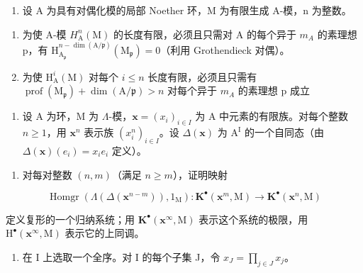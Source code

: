\begin{enumerate}
\def\labelenumi{\arabic{enumi})}
\setcounter{enumi}{5}
\tightlist
\item
  设 A 为具有对偶化模的局部 Noether 环，M 为有限生成 A-模，n 为整数。
\end{enumerate}

\begin{enumerate}
\def\labelenumi{\alph{enumi})}
\item
  为使 A-模 \(H_{\mathrm{A}}^{n}(\mathrm{M})\) 的长度有限，必须且只需对 A 的每个异于 \(m_{A}\) 的素理想 p，有 \(\mathrm{H}_{\mathrm{A}_{\mathfrak{p}}}^{n-\dim(\mathrm{A}/\mathfrak{p})}(\mathrm{M}_{\mathfrak{p}})=0\)（利用 Grothendieck 对偶）。
\item
  为使 \(\mathrm{H}_{\mathrm{A}}^{i}(\mathrm{M})\) 对每个 \(i \leqslant n\) 长度有限，必须且只需有 \(\operatorname{prof}(\mathrm{M}_{\mathfrak{p}}) + \dim(\mathrm{A}/\mathfrak{p}) > n\) 对每个异于 \(m_{A}\) 的素理想 p 成立
\end{enumerate}

\begin{enumerate}
\def\labelenumi{\arabic{enumi})}
\setcounter{enumi}{6}
\tightlist
\item
  设 A 为环，M 为 \(\Lambda\)-模，\(\mathbf{x} = (x_i)_{i \in I}\) 为 A 中元素的有限族。对每个整数 \(n \geqslant 1\)，用 \(\mathbf{x}^n\) 表示族 \((x_i^n)_{i \in I}\)。设 \(\Delta(\mathbf{x})\) 为 \(\mathrm{A}^{\mathrm{I}}\) 的一个自同态（由 \(\Delta(\mathbf{x})(e_i) = x_i e_i\) 定义）。
\end{enumerate}

\begin{enumerate}
\def\labelenumi{\alph{enumi})}
\tightlist
\item
  对每对整数 \((n, m)\)（满足 \(n \geqslant m\)），证明映射
\end{enumerate}

\[
\operatorname{Homgr} \left(\Lambda \left(\Delta \left(\mathbf {x} ^ {n - m}\right)\right), 1 _ {\mathrm{M}}\right): \mathbf {K} ^ {\bullet} \left(\mathbf {x} ^ {m}, \mathrm{M}\right) \longrightarrow \mathbf {K} ^ {\bullet} \left(\mathbf {x} ^ {n}, \mathrm{M}\right)
\]

定义复形的一个归纳系统；用 \(\mathbf{K}^{\bullet}(\mathbf{x}^{\infty},\mathrm{M})\) 表示这个系统的极限，用 \(\mathrm{H}^{\bullet}(\mathbf{x}^{\infty},\mathrm{M})\) 表示它的上同调。

\begin{enumerate}
\def\labelenumi{\alph{enumi})}
\setcounter{enumi}{1}
\tightlist
\item
  在 I 上选取一个全序。对 I 的每个子集 J，令 \(x_{J} = \prod_{j \in J} x_{j}\)。
\end{enumerate}

